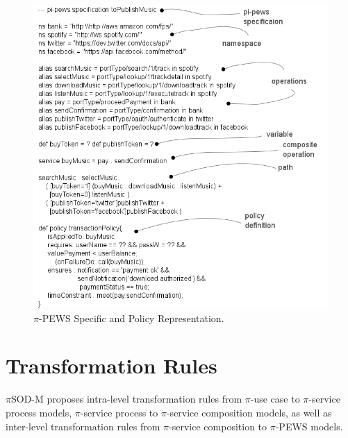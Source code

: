 \documentclass{singlecol-new}
\theoremstyle{TH}{
\newtheorem{lemma}{Lemma}
\newtheorem{theorem}[lemma]{Theorem}
\newtheorem{corrolary}[lemma]{Corrolary}
\newtheorem{conjecture}[lemma]{Conjecture}
\newtheorem{proposition}[lemma]{Proposition}
\newtheorem{claim}[lemma]{Claim}
\newtheorem{stheorem}[lemma]{Wrong Theorem}
\newtheorem{algorithm}{Algorithm}
}
\theoremstyle{THrm}{
\newtheorem{definition}{Definition}[section]
\newtheorem{question}{Question}[section]
\newtheorem{remark}{Remark}
\newtheorem{scheme}{Scheme}
}
\theoremstyle{THhit}{
\newtheorem{case}{Case}[section]
}
\theoremstyle{THhsl}{
\newtheorem{example}{Example}
}
\newcommand{\pisodm}[0]{$\pi$SOD-M\xspace}
\begin{document}
\begin{figure}[h]
\centering
\includegraphics[width=1\textwidth]{./figures/pi-pewsSpecification-toPublishMusic}
\caption{$\pi$-PEWS Specific and Policy Representation.}
\label{fig:Specific-Contract-Representation}
\end{figure}

\section{Transformation Rules}\label{sec:mmrules}


\pisodm  proposes intra-level transformation rules from $\pi$-use case to $\pi$-service process models, $\pi$-service process to $\pi$-service composition  models, as well as inter-level transformation rules from $\pi$-service composition to $\pi$-PEWS models. 
\end{document}
